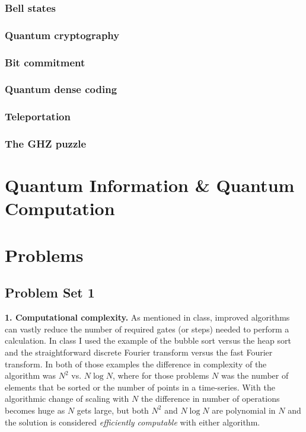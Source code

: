 \documentclass{book}
\theoremstyle{definition}
\begin{document}
\subsection{Bell states}
\subsection{Quantum cryptography}
\subsection{Bit commitment}
\subsection{Quantum dense coding}
\subsection{Teleportation}
\subsection{The GHZ puzzle}











\chapter{Quantum Information \& Quantum Computation}
\newpage




\chapter{Problems}

\newpage

\section{Problem Set 1}



\noindent \textbf{1. Computational complexity.}  As mentioned in class, improved algorithms can vastly reduce
the number of required gates (or steps) needed to perform a calculation. In class I used the
example of the bubble sort versus the heap sort and the straightforward discrete Fourier
transform versus the fast Fourier transform. In both of those examples the difference in
complexity of the algorithm was $N^2$ vs. $N \log N$, where for those problems $N$ was the number
of elements that be sorted or the number of points in a time-series. With the algorithmic
change of scaling with $N$ the difference in number of operations becomes huge as $N$ gets
large, but both $N^2$ and $N \log N$ are polynomial in $N$ and the solution is considered \textit{efficiently
computable} with either algorithm.
\\
\end{document}
